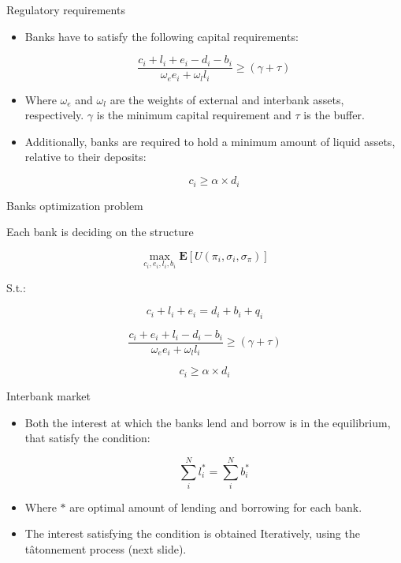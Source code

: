 \documentclass{beamer}
\begin{document}
\begin{frame}{Regulatory requirements}

    \begin{itemize}
        \item Banks have to satisfy the following capital requirements:
        
        \[\frac{c_i + l_i + e_i - d_i - b_i}{\omega_e e_i + \omega_l l_i} \geq (\gamma + \tau)\]

        \item Where $\omega_e$ and $\omega_l$ are the weights of external and interbank assets, respectively. $\gamma$ is the minimum capital requirement and $\tau$ is the buffer.
        
        \item Additionally, banks are required to hold a minimum amount of liquid assets, relative to their deposits:
        
        \[c_i \geq \alpha \times d_i\]

    \end{itemize}

\end{frame}

\begin{frame}{Banks optimization problem}

    Each bank is deciding on the structure 

    \[\max_{c_i, e_i, l_i, b_i} \mathbf{E}[U(\pi_i, \sigma_i, \sigma_\pi)]\]

    S.t.:

    \[c_i + l_i + e_i = d_i + b_i + q_i\]

    \[\frac{c_i + e_i + l_i - d_i - b_i}{\omega_e e_i + \omega_l l_i} \geq (\gamma + \tau)\]
    
    \[c_i \geq \alpha \times d_i\]
        
\end{frame}

\begin{frame}{Interbank market}
    
    \begin{itemize}
        \item Both the interest at which the banks lend and borrow is in the equilibrium, that satisfy the condition:
        
        \[\sum_{i}^{N} l_i^* = \sum_{i}^{N} b_i^*\]
        
        \item Where $*$ are optimal amount of lending and borrowing for each bank.
        
        \item The interest satisfying the condition is obtained Iteratively, using the tâtonnement process (next slide). 
    \end{itemize}

\end{frame}
\end{document}
